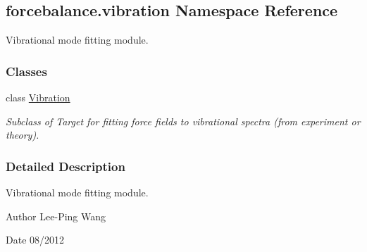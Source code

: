 \hypertarget{namespaceforcebalance_1_1vibration}{\subsection{forcebalance.\-vibration Namespace Reference}
\label{namespaceforcebalance_1_1vibration}
}


Vibrational mode fitting module.  


\subsubsection*{Classes}
\begin{DoxyCompactItemize}
\item 
class \hyperlink{classforcebalance_1_1vibration_1_1Vibration}{Vibration}
\begin{DoxyCompactList}\small\item\em Subclass of Target for fitting force fields to vibrational spectra (from experiment or theory). \end{DoxyCompactList}\end{DoxyCompactItemize}


\subsubsection{Detailed Description}
Vibrational mode fitting module. \begin{DoxyAuthor}{Author}
Lee-\/\-Ping Wang 
\end{DoxyAuthor}
\begin{DoxyDate}{Date}
08/2012 
\end{DoxyDate}
